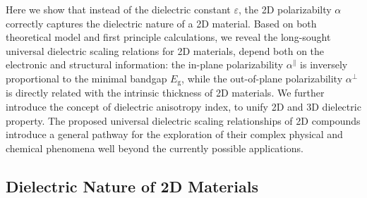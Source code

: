 \documentclass[journal=ancac3,manuscript=article,email=true,hyperref=true,keywords=false]{achemso}
\begin{document}
Here we show that instead of the dielectric constant $\varepsilon$,
the 2D polarizabilty $\alpha$ correctly captures the dielectric nature
of a 2D material. Based on both theoretical model and first principle
calculations, we reveal the long-sought universal dielectric scaling
relations for 2D materials, depend both on the electronic and
structural information: the in-plane polarizability
$\alpha^{\parallel}$ is inversely proportional to the minimal bandgap
$E_{\mathrm{g}}$, while the out-of-plane polarizability
$\alpha^{\perp}$ is directly related with the intrinsic thickness of
2D materials. We further introduce the concept of dielectric
anisotropy index, to unify 2D and 3D dielectric property. The proposed
universal dielectric scaling relationships of 2D compounds introduce a
general pathway for the exploration of their complex physical and
chemical phenomena well beyond the currently possible applications.


\subsection{Dielectric Nature of 2D Materials}
\label{sec:2d}
\end{document}
